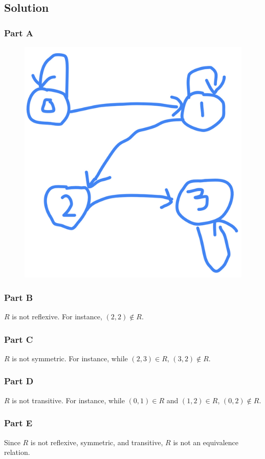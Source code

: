 \documentclass[table]{article}
\begin{document}
\subsection{Solution}
\subsubsection{Part A}
\begin{figure}[h!]
	\includegraphics[scale=.3]{images/Prob6a.png}
\end{figure}
\subsubsection{Part B}
$R$ is not reflexive. For instance, $(2, 2) \not\in R$.
\subsubsection{Part C}
$R$ is not symmetric. For instance, while $(2, 3) \in R$, $(3, 2) \not\in R$.
\subsubsection{Part D}
$R$ is not transitive. For instance, while $(0, 1) \in R$ and $(1, 2) \in R$, $(0, 2) \not\in R$.
\subsubsection{Part E}
Since $R$ is not reflexive, symmetric, and transitive, $R$ is not an equivalence relation.
\end{document}
